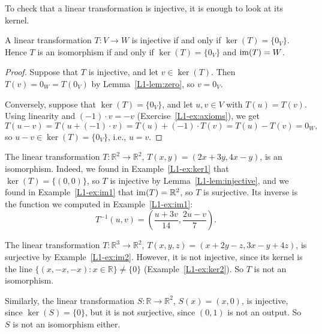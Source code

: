 To check that a linear transformation is injective, it is enough to look at its kernel.

\begin{lemma}\label{L1-lem:injective}
    A linear transformation $T: V \to W$ is injective if and only if $\ker(T) = \{0_V\}$. Hence $T$ is an isomorphism if and only if $\ker(T) = \{0_V\}$ and $\operatorname{im}(T) = W$.
\end{lemma}

\begin{proof}
    Suppose that $T$ is injective, and let $v \in \ker(T)$. Then $T(v) = 0_W = T(0_V)$ by Lemma~\ref{L1-lem:zero}, so $v = 0_V$.

    Conversely, suppose that $\ker(T) = \{0_V\}$, and let $u, v \in V$ with $T(u) = T(v)$. Using linearity and $(-1) \cdot v = -v$ (Exercise~\ref{L1-ex:axioms}), we get
    \[T(u - v) = T(u + (-1) \cdot v) = T(u) + (-1) \cdot T(v) = T(u) - T(v) = 0_W,\]
    so $u - v \in \ker(T) = \{0_V\}$, i.e., $u = v$.
\end{proof}

\begin{example}\label{L1-ex:iso1}
    The linear transformation $T: \mathbb{R}^2 \to \mathbb{R}^2$, $T(x, y) = (2x + 3y, 4x - y)$, is an isomorphism. Indeed, we found in Example~\ref{L1-ex:ker1} that $\ker(T) = \{(0, 0)\}$, so $T$ is injective by Lemma~\ref{L1-lem:injective}, and we found in Example~\ref{L1-ex:im1} that $\operatorname{im}(T) = \mathbb{R}^2$, so $T$ is surjective. Its inverse is the function we computed in Example~\ref{L1-ex:im1}:
    \[T^{-1}(u, v) = \left(\frac{u + 3v}{14}, \frac{2u - v}{7}\right).\]
\end{example}

\begin{example}
    The linear transformation $T: \mathbb{R}^3 \to \mathbb{R}^2$, $T(x, y, z) = (x + 2y - z, 3x - y + 4z)$, is surjective by Example~\ref{L1-ex:im2}. However, it is not injective, since its kernel is the line $\{(x, -x, -x) : x \in \mathbb{R}\} \neq \{0\}$ (Example~\ref{L1-ex:ker2}). So $T$ is not an isomorphism.

    Similarly, the linear transformation $S: \mathbb{R} \to \mathbb{R}^2$, $S(x) = (x, 0)$, is injective, since $\ker(S) = \{0\}$, but it is not surjective, since $(0, 1)$ is not an output. So $S$ is not an isomorphism either.
\end{example}

